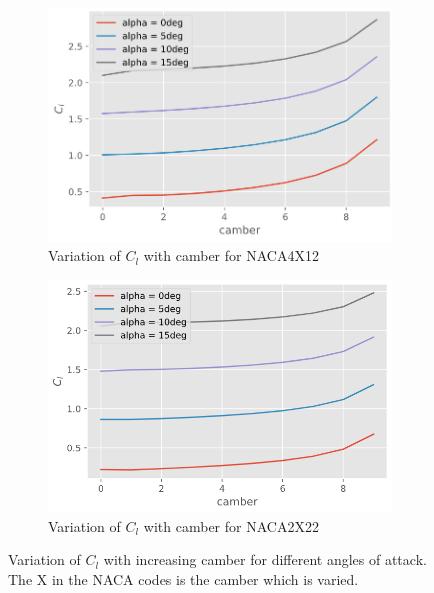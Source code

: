 \begin{figure}[h]
    \centering
    \begin{subfigure}{.5\textwidth}
      \centering
      \captionsetup{width=.8\linewidth}
      \includegraphics[width=.9\linewidth]{static/cambereffect_thick.png}
      \caption{\centering Variation of $C_l$ with camber for NACA4X12}
      \label{fig:cambercl1}
    \end{subfigure}\hfill%
    \begin{subfigure}{.5\textwidth}
      \centering
      \captionsetup{width=.9\linewidth}
      \includegraphics[width=.9\linewidth]{static/cambereffect2_thick.png}
      \caption{\centering Variation of $C_l$ with camber for NACA2X22}
      \label{fig:cambercl2}
    \end{subfigure}
    \caption{\centering Variation of $C_l$ with increasing camber for different angles of attack. The X in the NACA codes is the camber which is varied.}
    \label{fig:cambercl}
\end{figure}



